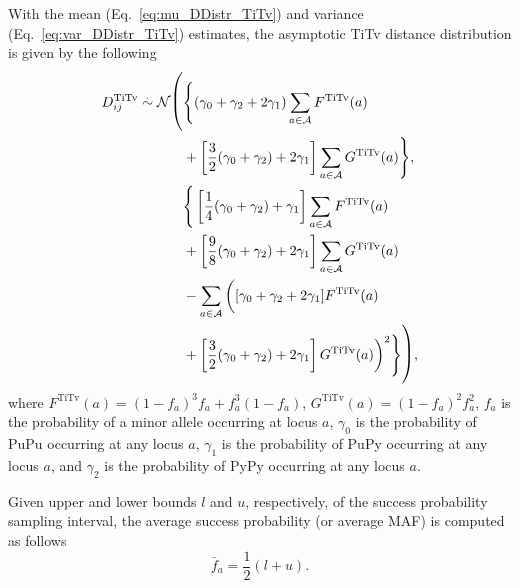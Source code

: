 \documentclass[aos]{imsart}
\begin{document}
With the mean (Eq.~\ref{eq:mu_DDistr_TiTv}) and variance (Eq.~\ref{eq:var_DDistr_TiTv}) estimates, the asymptotic TiTv distance distribution is given by the following
%
\begin{equation}\label{eq:DDistr_TiTv}
\begin{aligned}
D^\text{TiTv}_{ij} \overset{.}{\sim} \mathcal{N}{\fontsize{0.5cm}{1pt}\selectfont \Biggl(}& {\Biggl\{}(\gamma_0 + \gamma_2 + 2\gamma_1) \sum_{a \in \mathcal{A}} F^\text{TiTv}(a) \\
&+ \left[\frac{3}{2}(\gamma_0 + \gamma_2) + 2\gamma_1\right] \sum_{a \in \mathcal{A}} G^\text{TiTv}(a){\Biggr\}}, \\
&{\Biggl\{}\left[\frac{1}{4}(\gamma_0 + \gamma_2) + \gamma_1\right] \sum_{a \in \mathcal{A}} F^\text{TiTv}(a) \\
&+ \left[\frac{9}{8}(\gamma_0 + \gamma_2) + 2\gamma_1\right] \sum_{a \in \mathcal{A}} G^\text{TiTv}(a) \\
&- \sum_{a \in \mathcal{A}} {\biggl(}[\gamma_0 + \gamma_2 + 2\gamma_1] F^\text{TiTv}(a) \\
&+ \left[\frac{3}{2}(\gamma_0 + \gamma_2) + 2\gamma_1\right] G^\text{TiTv}(a){\biggr)}^2{\Biggr\}}{\fontsize{0.5cm}{1pt}\selectfont \Biggr)},
\end{aligned}
\end{equation}
%
where $F^\text{TiTv}(a) = (1 - f_a)^3 f_a + f^3_a (1 - f_a)$, $G^\text{TiTv}(a) = (1 - f_a)^2 f^2_a$, $f_a$ is the probability of a minor allele occurring at locus $a$, $\gamma_0$ is the probability of PuPu occurring at any locus $a$, $\gamma_1$ is the probability of PuPy occurring at any locus $a$, and $\gamma_2$ is the probability of PyPy occurring at any locus $a$.

Given upper and lower bounds $l$ and $u$, respectively, of the success probability sampling interval, the average success probability (or average MAF) is computed as follows
%
\begin{equation}\label{eq:avg_maf}
\bar{f}_a = \frac{1}{2}(l + u).
\end{equation}
\end{document}
